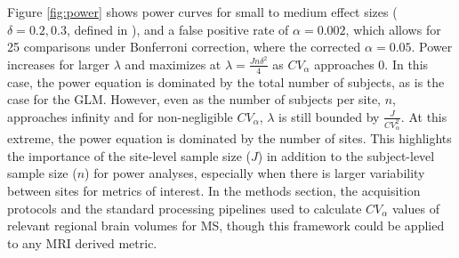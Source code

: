 Figure \ref{fig:power} shows power curves for small to medium effect sizes ( $\delta = 0.2, 0.3$, defined in \cite{Raudenbush2000}), and a false positive rate of $\alpha = 0.002$, which allows for 25 comparisons under Bonferroni correction, where the corrected $\alpha = 0.05$. Power increases for larger $\lambda$  and maximizes at $\lambda = \frac{Jn\delta^2}{4}$ as $CV_\alpha$ approaches 0. In this case, the power equation is dominated by the total number of subjects, as is the case for the GLM. However, even as the number of subjects per site, $n$, approaches infinity and for non-negligible $CV_\alpha$, $\lambda$ is still bounded by $\frac{J}{CV_\alpha^2}$. At this extreme, the  power equation is dominated by the number of sites. This highlights the importance of the site-level sample size ($J$) in addition to the subject-level sample size ($n$) for power analyses, especially when there is larger variability between sites for metrics of interest. In the methods section, the acquisition protocols and the standard processing pipelines used to calculate $CV_\alpha$ values of relevant regional brain volumes for MS, though this framework could be applied to any MRI derived metric.